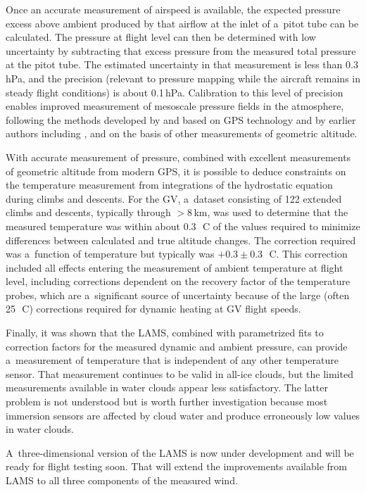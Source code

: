 \documentclass[amtd, online, hvmath]{copernicus}
\begin{document}
Once an accurate measurement of airspeed is available, the expected
pressure excess above ambient produced by that airflow at the inlet of
a~pitot tube can be calculated. The pressure at flight level can then
be determined with low uncertainty by subtracting that excess pressure
from the measured total pressure at the pitot tube. The estimated
uncertainty in that measurement is less than 0.3\,hPa, and the
precision (relevant to pressure mapping while the aircraft remains in
steady flight conditions) is about 0.1\,hPa. Calibration to this level
of precision enables improved measurement of mesoscale pressure fields
in the atmosphere, following the methods developed by
\citet{ParishEtAl2007} and \citet{ParishLeon2013} based on GPS
technology and by earlier authors including \citet{BrownEtAl1981},
\citet{ShapiroKennedy1981} and \citet{LemoneTarleton1986} on the basis
of other measurements of geometric altitude.

With accurate measurement of pressure, combined with excellent
measurements of geometric altitude from modern GPS, it is possible to
deduce constraints on the temperature measurement from integrations of
the hydrostatic equation during climbs and descents. For the GV,
a~dataset consisting of 122 extended climbs and descents, typically
through $>8$\,km, was used to determine that the measured temperature
was within about 0.3\,\unit{{\degree}C} of the values required to
minimize differences between calculated and true altitude changes. The
correction required was a~function of temperature but typically was
$+0.3\pm 0.3$\,\unit{{\degree}C}. This correction included all effects
entering the measurement of ambient temperature at flight level,
including corrections dependent on the recovery factor of the
temperature probes, which are a~significant source of uncertainty
because of the large (often 25\,\unit{{\degree}C}) corrections
required for dynamic heating at GV flight speeds.

Finally, it was shown that the LAMS, combined with parametrized fits
to correction factors for the measured dynamic and ambient pressure,
can provide a~measurement of temperature that is independent of any
other temperature sensor. That measurement continues to be valid in
all-ice clouds, but the limited measurements available in water clouds
appear less satisfactory. The latter problem is not understood but is
worth further investigation because most immersion sensors are
affected by cloud water and produce erroneously low values in water
clouds.

A~three-dimensional version of the LAMS is now under development and
will be ready for flight testing soon. That will extend the
improvements available from LAMS to all three components of the
measured wind.
\end{document}

